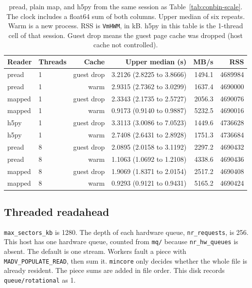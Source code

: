 \begin{table}[ht]
\centering
\caption{pread, plain map, and h5py from the same session as
Table~\ref{tab:conbin-scale}.
The clock includes a float64 sum of both columns.
Upper median of six repeats.
Warm is a new process.
RSS is \texttt{VmHWM}, in kB. h5py in this table is the 1-thread cell of
that session.
Guest drop means the guest page cache was dropped (host cache not
controlled).}
\label{tab:conbin-mmap-sum}
\begin{tabular}{@{}llrrrr@{}}
\toprule
Reader & Threads & Cache & Upper median (s) & MB/s & RSS \\
\midrule
pread & 1 & guest drop & 3.2126 (2.8225 to 3.8666) & 1494.1 & 4689984 \\
pread & 1 & warm & 2.9315 (2.7362 to 3.0299) & 1637.4 & 4690000 \\
mapped & 1 & guest drop & 2.3343 (2.1735 to 2.5727) & 2056.3 & 4690076 \\
mapped & 1 & warm & 0.9173 (0.9140 to 0.9887) & 5232.5 & 4690016 \\
h5py & 1 & guest drop & 3.3113 (3.0086 to 7.0523) & 1449.6 & 4736628 \\
h5py & 1 & warm & 2.7408 (2.6431 to 2.8928) & 1751.3 & 4736684 \\
pread & 8 & guest drop & 2.0895 (2.0158 to 3.1192) & 2297.2 & 4690432 \\
pread & 8 & warm & 1.1063 (1.0692 to 1.2108) & 4338.6 & 4690436 \\
mapped & 8 & guest drop & 1.9069 (1.8371 to 2.0154) & 2517.2 & 4690408 \\
mapped & 8 & warm & 0.9293 (0.9121 to 0.9431) & 5165.2 & 4690424 \\
\bottomrule
\end{tabular}
\end{table}

\subsection{Threaded readahead}
\label{sec:conbin-scale}

\texttt{max\_sectors\_kb} is 1280.
The depth of each hardware queue, \texttt{nr\_requests}, is 256.
This host has one hardware queue, counted from \texttt{mq/} because
\texttt{nr\_hw\_queues} is absent.
The default is one stream.
Workers fault a piece with \texttt{MADV\_POPULATE\_READ}, then sum it.
\texttt{mincore} only decides whether the whole file is already
resident.
The piece sums are added in file order.
This disk records \texttt{queue/rotational} as 1.

